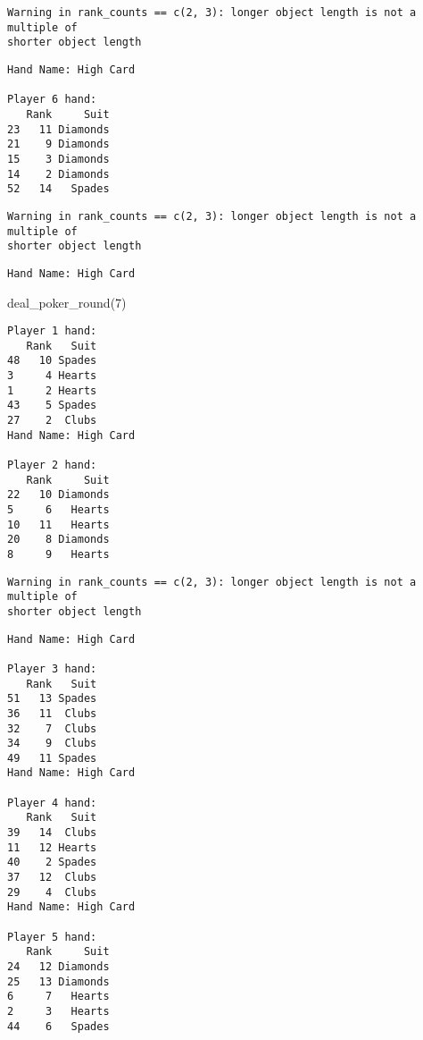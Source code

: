 \documentclass[
  letterpaper,
  DIV=11,
  numbers=noendperiod]{scrartcl}
\newenvironment{Shaded}{\begin{snugshade}}{\end{snugshade}}
\newcommand{\DecValTok}[1]{\textcolor[rgb]{0.68,0.00,0.00}{#1}}
\newcommand{\FunctionTok}[1]{\textcolor[rgb]{0.28,0.35,0.67}{#1}}
\newcommand{\NormalTok}[1]{\textcolor[rgb]{0.00,0.23,0.31}{#1}}
\begin{document}
\begin{verbatim}
Warning in rank_counts == c(2, 3): longer object length is not a multiple of
shorter object length
\end{verbatim}

\begin{verbatim}
Hand Name: High Card 

Player 6 hand: 
   Rank     Suit
23   11 Diamonds
21    9 Diamonds
15    3 Diamonds
14    2 Diamonds
52   14   Spades
\end{verbatim}

\begin{verbatim}
Warning in rank_counts == c(2, 3): longer object length is not a multiple of
shorter object length
\end{verbatim}

\begin{verbatim}
Hand Name: High Card 
\end{verbatim}

\begin{Shaded}
\begin{Highlighting}[]
\FunctionTok{deal\_poker\_round}\NormalTok{(}\DecValTok{7}\NormalTok{)}
\end{Highlighting}
\end{Shaded}

\begin{verbatim}
Player 1 hand: 
   Rank   Suit
48   10 Spades
3     4 Hearts
1     2 Hearts
43    5 Spades
27    2  Clubs
Hand Name: High Card 

Player 2 hand: 
   Rank     Suit
22   10 Diamonds
5     6   Hearts
10   11   Hearts
20    8 Diamonds
8     9   Hearts
\end{verbatim}

\begin{verbatim}
Warning in rank_counts == c(2, 3): longer object length is not a multiple of
shorter object length
\end{verbatim}

\begin{verbatim}
Hand Name: High Card 

Player 3 hand: 
   Rank   Suit
51   13 Spades
36   11  Clubs
32    7  Clubs
34    9  Clubs
49   11 Spades
Hand Name: High Card 

Player 4 hand: 
   Rank   Suit
39   14  Clubs
11   12 Hearts
40    2 Spades
37   12  Clubs
29    4  Clubs
Hand Name: High Card 

Player 5 hand: 
   Rank     Suit
24   12 Diamonds
25   13 Diamonds
6     7   Hearts
2     3   Hearts
44    6   Spades
\end{verbatim}
\end{document}
